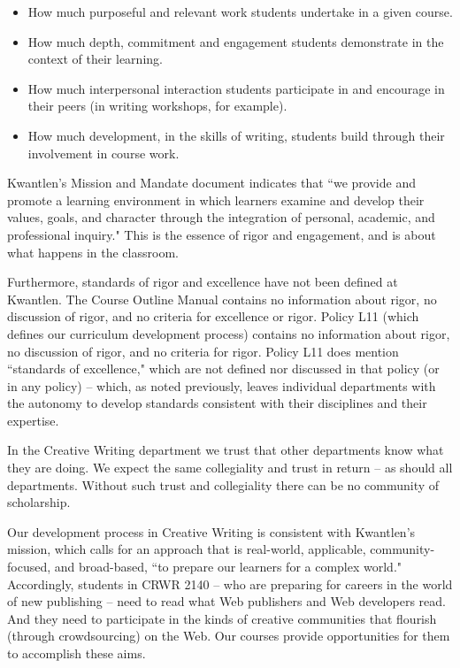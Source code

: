 \documentclass[letterpaper,10pt,headsepline]{scrreprt}
\begin{document}
\begin{itemize}

\item How much purposeful and relevant work students undertake in a given course.

\item How much depth, commitment and engagement students demonstrate in the context of their learning.

\item How much interpersonal interaction students participate in and encourage in their peers (in writing workshops, for example).

\item How much development, in the skills of writing, students build through their involvement in course work.

\end{itemize}

Kwantlen's Mission and Mandate document indicates that ``we provide and promote a learning environment in which learners examine and develop their values, goals, and character through the integration of personal, academic, and professional inquiry." This is the essence of rigor and engagement, and is about what happens in the classroom.

Furthermore, standards of rigor and excellence have not been defined at Kwantlen. The Course Outline Manual contains no information about rigor, no discussion of rigor, and no criteria for excellence or rigor. Policy L11 (which defines our curriculum development process) contains no information about rigor, no discussion of rigor, and no criteria for rigor. Policy L11 does mention ``standards of excellence," which are not defined nor discussed in that policy (or in any policy) -- which, as noted previously, leaves individual departments with the autonomy to develop standards consistent with their disciplines and their expertise.

In the Creative Writing department we trust that other departments know what they are doing. We expect the same collegiality and trust in return -- as should all departments. Without such trust and collegiality there can be no community of scholarship.

Our development process in Creative Writing is consistent with Kwantlen's mission, which calls for an approach that is real-world, applicable, community-focused, and broad-based, ``to prepare our learners for a complex world." Accordingly, students in CRWR 2140 -- who are preparing for careers in the world of new publishing -- need to read what Web publishers and Web developers read. And they need to participate in the kinds of creative communities that flourish (through crowdsourcing) on the Web. Our courses provide opportunities for them to accomplish these aims.
\end{document}
